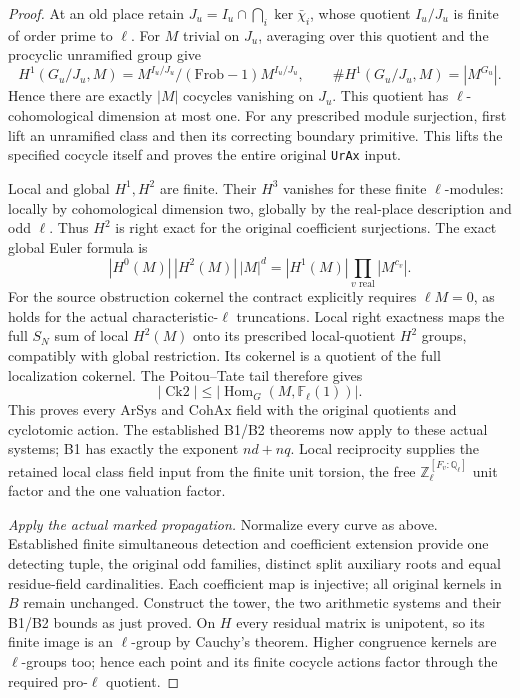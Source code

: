 \begin{proof}
At an old place retain
$J_u=I_u\cap\bigcap_i\ker\bar\chi_i$, whose quotient $I_u/J_u$
is finite of order prime to $\ell$.  For $M$ trivial on $J_u$, averaging
over this quotient and the procyclic unramified group give
\[
 H^1(G_u/J_u,M)=M^{I_u/J_u}/(\mathrm{Frob}-1)M^{I_u/J_u},
 \qquad \#H^1(G_u/J_u,M)=|M^{G_u}|.
\]
Hence there are exactly $|M|$ cocycles vanishing on $J_u$.
This quotient has $\ell$-cohomological dimension at most one.
For any prescribed module surjection, first lift an unramified class
and then its correcting boundary primitive.  This lifts the specified
cocycle itself and proves the entire original \texttt{UrAx} input.

Local and global $H^1,H^2$ are finite.  Their $H^3$ vanishes for these
finite $\ell$-modules: locally by cohomological dimension two, globally
by the real-place description and odd $\ell$.  Thus $H^2$ is right exact
for the original coefficient surjections.  The exact global Euler
formula is
\[
 |H^0(M)|\,|H^2(M)|\,|M|^d
       =|H^1(M)|\prod_{v\text{ real}}|M^{c_v}|.             \tag{RP8}
\]
For the source obstruction cokernel the contract explicitly requires
$\ell M=0$, as holds for the actual characteristic-$\ell$ truncations.
Local right exactness maps the
full $S_N$ sum of local $H^2(M)$ onto its prescribed local-quotient
$H^2$ groups, compatibly with global restriction.  Its cokernel is a
quotient of the full localization cokernel.  The Poitou--Tate tail
therefore gives
\[
             |\operatorname{Ck2}|
                 \le |\operatorname{Hom}_G(M,\mathbb F_\ell(1))|.
\]
This proves every ArSys and CohAx field with the original quotients
and cyclotomic action.  The established B1/B2 theorems now apply to
these actual systems; B1 has exactly the exponent $nd+nq$.
Local reciprocity supplies the retained local class field input from
the finite unit torsion, the free $\mathbb Z_\ell^{[F_v:\mathbb Q_\ell]}$
unit factor and the one valuation factor\cite[I.1.1]{SelmerArPropCFT}.

\emph{Apply the actual marked propagation.}
Normalize every curve as above.  Established finite simultaneous
detection and coefficient extension provide one detecting tuple,
the original odd families, distinct split auxiliary roots and equal
residue-field cardinalities.  Each coefficient map is injective;
all original kernels in $B$ remain unchanged.  Construct the tower,
the two arithmetic systems and their B1/B2 bounds as just proved.
On $H$ every residual matrix is unipotent, so its finite image is an
$\ell$-group by Cauchy's theorem.  Higher congruence kernels are
$\ell$-groups too; hence each point and its finite cocycle actions
factor through the required pro-$\ell$ quotient.


\end{proof}
